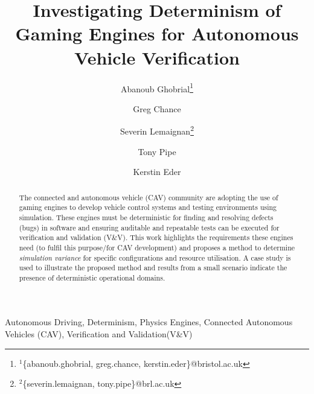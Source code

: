 \title{Investigating Determinism of Gaming Engines for Autonomous Vehicle Verification}


\author[1,3]{Abanoub Ghobrial\thanks{$^{1}${\footnotesize \{abanoub.ghobrial, greg.chance, kerstin.eder\}@bristol.ac.uk}}}
\author[1,3]{Greg Chance}
\author[2,3]{Severin Lemaignan\thanks{$^{2}${\footnotesize \{severin.lemaignan, tony.pipe\}@brl.ac.uk}}}
\author[2,3]{Tony Pipe}
\author[1,3]{Kerstin Eder}





\maketitle

\begin{abstract}
\noindent 
The connected and autonomous vehicle (CAV) community are adopting the use of gaming engines to develop vehicle control systems and testing environments using simulation. These engines must be deterministic for finding and resolving defects (bugs) in software and ensuring auditable and repeatable tests can be executed for verification and validation (V\&V). This work highlights the requirements these engines need (to fulfil this purpose/for CAV development) and proposes a method to determine \textit{simulation variance} for specific configurations and resource utilisation. A case study is used to illustrate the proposed method and results from a small scenario indicate the presence of deterministic operational domains. 
\end{abstract}

\begin{IEEEkeywords}
Autonomous Driving, Determinism, Physics Engines, Connected Autonomous Vehicles (CAV), Verification and Validation(V\&V)
\end{IEEEkeywords}
\IEEEpeerreviewmaketitle